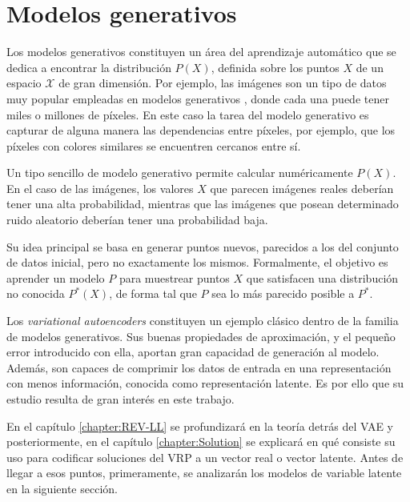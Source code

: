 \section{Modelos generativos}\label{1-GenModel}

Los modelos generativos constituyen un área del aprendizaje automático que se dedica a encontrar la distribución $P(X)$, definida sobre los puntos $X$ de un espacio $\mathcal{X}$ de gran dimensión. Por ejemplo, las imágenes son un tipo de datos muy popular empleadas en modelos generativos \cite{VAETutorial}, donde cada una puede tener miles o millones de píxeles. En este caso la tarea del modelo generativo es capturar de alguna manera las dependencias entre píxeles, por ejemplo, que los píxeles con colores similares se encuentren cercanos entre sí.

Un tipo sencillo de modelo generativo permite calcular numéricamente $P(X)$. En el caso de las imágenes, los valores $X$ que parecen imágenes reales deberían tener una alta probabilidad, mientras que las imágenes que posean determinado ruido aleatorio deberían tener una probabilidad baja.

 Su idea principal se basa en generar puntos nuevos, parecidos a los del conjunto de datos inicial, pero no exactamente los mismos. Formalmente, el objetivo es aprender un modelo $P$ para muestrear puntos $X$ que satisfacen una distribución no conocida $P^{*}(X)$, de forma tal que $P$ sea lo más parecido posible a $P^{*}$.
 
 Los \textit{variational autoencoders} constituyen un ejemplo clásico dentro de la familia de modelos generativos. Sus buenas propiedades de aproximación, y el pequeño error introducido con ella, aportan gran capacidad de generación al modelo. Además, son capaces de comprimir los datos de entrada en una representación con menos información, conocida como representación latente. Es por ello que su estudio resulta de gran interés en este trabajo.
 
  En el capítulo \ref{chapter:REV-LL} se profundizará en la teoría detrás del VAE y posteriormente, en el capítulo \ref{chapter:Solution} se explicará en qué consiste su uso para codificar soluciones del VRP a un vector real o vector latente. Antes de llegar a esos puntos, primeramente, se analizarán los modelos de variable latente en la siguiente sección. 
 
 
 


